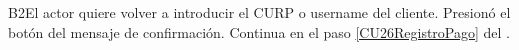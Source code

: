 		\begin{UCtrayectoriaA}{B2}{El actor quiere volver a introducir el CURP o username del cliente.}
			\UCpaso[\UCactor] Presionó el botón  del mensaje de confirmación.
			\UCpaso Continua en el paso \ref{CU26RegistroPago} del . 
		\end{UCtrayectoriaA}		
		
